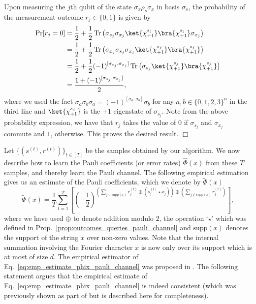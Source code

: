 \documentclass[11pt]{article}
\theoremstyle{plain}
\renewcommand{\Pr}{\mbox{\rm Pr}}
\DeclareMathOperator{\Tr}{Tr}
\theoremstyle{plain}
\theoremstyle{definition}
\theoremstyle{remark}
\renewenvironment{proof}[1][]{
    \begin{trivlist}
    \item[\hspace{\labelsep}{\em\noindent Proof#1:\/}]}
    {{\hfill$\Box$}
    \end{trivlist}
}
\theoremstyle{named}
\begin{document}
\begin{proof}

    Upon measuring the $j$th qubit of the state $\sigma_x \rho_s \sigma_x$ in basis $\sigma_s$, the probability of the measurement outcome $r_j \in \{0,1\}$ is given by
    \begin{align*}
        \Pr[r_j = 0] &= \frac{1}{2} + \frac{1}{2}\Tr\left(\sigma_{s_j} \sigma_{x_j} \ket{\chi_{+1}^{s_j}}\bra{\chi_{+1}^{s_j}} \sigma_{x_j} \right) \\ 
        &= \frac{1}{2} + \frac{1}{2}\Tr\left(\sigma_{x_j} \sigma_{s_j} \sigma_{x_j} \ket{\chi_{+1}^{s_j}}\bra{\chi_{+1}^{s_j}} \right) \\
        &= \frac{1}{2} + \frac{1}{2}(-1)^{[\sigma_{s_j}, \sigma_{x_j}]} \Tr\left(\sigma_{s_j} \ket{\chi_{+1}^{s_j}}\bra{\chi_{+1}^{s_j}} \right) \\
        &= \frac{1 + (-1)^{[\sigma_{s_j}, \sigma_{x_j}]}}{2},
    \end{align*}
    where we used the fact $\sigma_{a} \sigma_{b} \sigma_{a} = (-1)^{[\sigma_a,\sigma_b]} \sigma_b$ for any $a,b \in \{0,1,2,3\}^n$ in the third line and $\ket{\chi_{+1}^{s_j}}$ is the $+1$ eigenstate of $\sigma_{s_j}$. Note from the above probability expression, we have that $r_j$ takes the value of $0$ if $\sigma_{s_j}$ and $\sigma_{x_j}$ commute and $1$, otherwise. This proves the desired result.
\end{proof}

Let $\{(s^{(t)}, r^{(t)})\}_{t \in [T]}$ be the samples obtained by our algorithm. We now describe how to learn the Pauli coefficients (or error rates) $\widehat{\Phi}(x)$ from these $T$ samples, and thereby learn the Pauli channel. The following empirical estimation gives us an estimate of the Pauli coefficients, which we denote by $\widetilde{\Phi}(x)$
\begin{equation}
    \widetilde{\Phi}(x) = \frac{1}{T} \sum_{t=1}^T \left[ \left(- \frac{1}{2}\right)^{\left(\sum \limits_{j \in \text{supp}(x)} r^{(t)}_j \oplus ({s^{(t)}_j} \star x_j) \right) \oplus \left(\sum \limits_{j \notin \text{supp}(x)} r^{(t)}_j \right) } \right],
    \label{eq:emp_estimate_phix_pauli_channel}
\end{equation}
where we have used $\oplus$ to denote addition modulo $2$, the operation `$\star$' which was defined in Prop.~\ref{prop:outcomes_queries_pauli_channel} and $\text{supp}(x)$ denotes the support of the string $x$ over non-zero values. Note that the internal summation involving the Fourier character $x$ is now only over its support which is at most of size $d$. The empirical estimator of Eq.~\ref{eq:emp_estimate_phix_pauli_channel} was proposed in \cite{flammia2021pauli}. The following statement argues that the empirical estimate of Eq.~\ref{eq:emp_estimate_phix_pauli_channel} is indeed consistent (which was previously shown as part of \cite[Theorem 22]{flammia2021pauli} but is described here for completeness).
\end{document}
